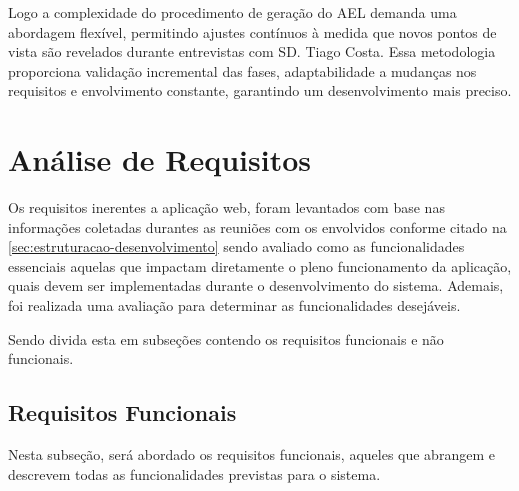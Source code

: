 Logo a complexidade do procedimento de geração do AEL demanda uma abordagem flexível, permitindo ajustes contínuos à medida que novos pontos de vista são revelados durante entrevistas com SD. Tiago Costa. Essa metodologia proporciona validação incremental das fases, adaptabilidade a mudanças nos requisitos e envolvimento constante, garantindo um desenvolvimento mais preciso.


\section{Análise de Requisitos}
Os requisitos inerentes a aplicação web, foram levantados com base nas informações coletadas durantes as reuniões com os envolvidos conforme citado na \autoref{sec:estruturacao-desenvolvimento} sendo avaliado como as funcionalidades essenciais aquelas que impactam diretamente o pleno funcionamento da aplicação, quais devem ser implementadas durante o desenvolvimento do sistema. Ademais, foi realizada uma avaliação para determinar as funcionalidades desejáveis.

Sendo divida esta em subseções contendo os requisitos funcionais e não funcionais.

\subsection{Requisitos Funcionais}
Nesta subseção, será abordado os requisitos funcionais, aqueles que abrangem e descrevem todas as funcionalidades previstas para o sistema. 

